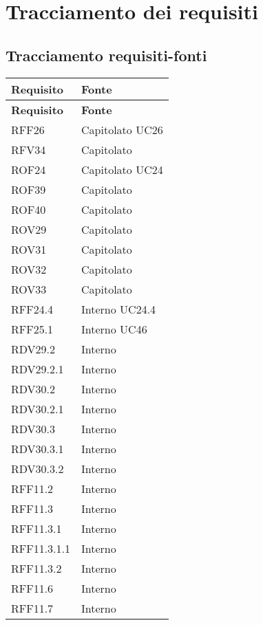 \section{Tracciamento dei requisiti}
\subsection{Tracciamento requisiti-fonti}
\def\arraystretch{1.5}
\begin{longtable}{p{2.5cm}!{\VRule[1pt]}p{2.5cm}}
	\color{white} \textbf{Requisito} & \color{white} \textbf{Fonte} \\ 
	\endfirsthead 
	\color{white} \textbf{Requisito} & \color{white} \textbf{Fonte} \\ 
	\endhead 
	RFF26 & Capitolato \newline UC26
	\\
	RFV34 & Capitolato \\
	ROF24 & Capitolato \newline UC24
	\\
	ROF39 & Capitolato \\
	ROF40 & Capitolato \\
	ROV29 & Capitolato \\
	ROV31 & Capitolato \\
	ROV32 & Capitolato \\
	ROV33 & Capitolato \\
	RFF24.4 & Interno \newline UC24.4
	\\
	RFF25.1 & Interno \newline UC46
	\\
	RDV29.2 & Interno \\
	RDV29.2.1 & Interno \\
	RDV30.2 & Interno \\
	RDV30.2.1 & Interno \\
	RDV30.3 & Interno \\
	RDV30.3.1 & Interno \\
	RDV30.3.2 & Interno \\
	RFF11.2 & Interno \\
	RFF11.3 & Interno \\
	RFF11.3.1 & Interno \\
	RFF11.3.1.1 & Interno \\
	RFF11.3.2 & Interno \\
	RFF11.6 & Interno \\
	RFF11.7 & Interno \\

\end{longtable}
